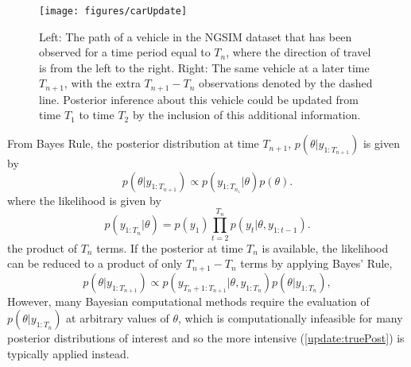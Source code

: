 \documentclass[12pt,a4paper]{article}\usepackage[]{graphicx}\usepackage[]{color}
\begin{document}
\begin{figure}[htbp]
\centering
\texttt{[image: figures/carUpdate]}
\caption{Left: The path of a vehicle in the NGSIM dataset that has been observed for a time period equal to $T_{n}$, where the direction of travel is from the left to the right. Right: The same vehicle at a later time $T_{n+1}$, with the extra $T_{n+1} - T_{n}$ observations denoted by the dashed line. Posterior inference about this vehicle could be updated from time $T_{1}$ to time $T_{2}$ by the inclusion of this additional information.}
\label{fig:updatetimeUpdate}
\end{figure}

From Bayes Rule, the posterior distribution at time $T_{n+1}$, $p(\theta | y_{1:T_{n+1}})$ is given by
\begin{equation}
\label{update:truePost}
p(\theta | y_{1:T_{n+1}}) \propto p(y_{1:T_{n_1}} | \theta)p(\theta).
\end{equation}
where the likelihood is given by
\begin{equation}
\label{update:likelihood}
p(y_{1:T_n} | \theta) = p(y_1) \prod_{t=2}^{T_n} p(y_t | \theta, y_{1:t-1}).
\end{equation}
the product of $T_n$ terms. If the posterior at time $T_{n}$ is available, the likelihood can be reduced to a product of only $T_{n+1} - T_{n}$ terms by applying Bayes' Rule,
\begin{equation}
\label{update:updatePost}
p(\theta | y_{1:T_{n+1}}) \propto p(y_{T_{n}+1:T_{n+1}} | \theta, y_{1:T_{n}})p(\theta | y_{1:T_{n}}),
\end{equation}
However, many Bayesian computational methods require the evaluation of $p(\theta | y_{1:T_{n}})$ at arbitrary values of $\theta$, which is computationally infeasible for many posterior distributions of interest and so the more intensive (\ref{update:truePost}) is typically applied instead.
\\
\end{document}
